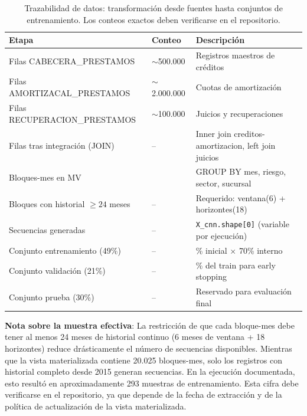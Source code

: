 \begin{table}[H]
    \centering
    \small
    \begin{tabular}{
        | >{\raggedright\arraybackslash}p{6.5cm}
        | >{\raggedleft\arraybackslash}p{2.5cm}        
        | >{\raggedright\arraybackslash}p{5.5cm} |   
    }
    \hline
        \textbf{Etapa} & \textbf{Conteo} & \textbf{Descripción} \\
    \hline
        Filas CABECERA\_PRESTAMOS & $\sim$500.000 & Registros maestros de créditos \\
    \hline
        Filas AMORTIZACAL\_PRESTAMOS & $\sim$2.000.000 & Cuotas de amortización \\
    \hline
        Filas RECUPERACION\_PRESTAMOS & $\sim$100.000 & Juicios y recuperaciones \\
    \hline
        Filas tras integración (JOIN) & -- & Inner join creditos-amortizacion, left join juicios \\
    \hline
        Bloques-mes en MV & 20.025 & GROUP BY mes, riesgo, sector, sucursal \\
    \hline
        Bloques con historial $\geq 24$ meses & -- & Requerido: ventana(6) + horizontes(18) \\
    \hline
        Secuencias generadas & -- & \texttt{X\_cnn.shape[0]} (variable por ejecución) \\
    \hline
        Conjunto entrenamiento (49\%) & -- & 70\% inicial $\times$ 70\% interno \\
    \hline
        Conjunto validación (21\%) & -- & 30\% del train para early stopping \\
    \hline
        Conjunto prueba (30\%) & -- & Reservado para evaluación final \\
    \hline
    \end{tabular}
    \caption{Trazabilidad de datos: transformación desde fuentes hasta conjuntos de entrenamiento. Los conteos exactos deben verificarse en el repositorio.}
    \label{tab:trazabilidad}
\end{table}

\textbf{Nota sobre la muestra efectiva}: La restricción de que cada bloque-mes debe tener al menos 24 meses de historial continuo (6 meses de ventana + 18 horizontes) reduce drásticamente el número de secuencias disponibles. Mientras que la vista materializada contiene 20.025 bloques-mes, solo los registros con historial completo desde 2015 generan secuencias. En la ejecución documentada, esto resultó en aproximadamente 293 muestras de entrenamiento. Esta cifra debe verificarse en el repositorio, ya que depende de la fecha de extracción y de la política de actualización de la vista materializada.


